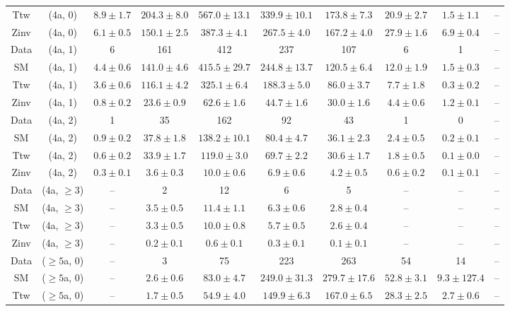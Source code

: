 \begin{table}[h!]
{\begin{tabular}{cccccccccc}
	Ttw & (4a, 0) & $8.9\pm 1.7$ & $204.3\pm 8.0$ & $567.0\pm 13.1$ & $339.9\pm 10.1$ & $173.8\pm 7.3$ & $20.9\pm 2.7$ & $1.5\pm 1.1$ & -- \\[0.5ex] 
	Zinv & (4a, 0) & $6.1\pm 0.5$ & $150.1\pm 2.5$ & $387.3\pm 4.1$ & $267.5\pm 4.0$ & $167.2\pm 4.0$ & $27.9\pm 1.6$ & $6.9\pm 0.4$ & -- \\[0.5ex] 
	Data & (4a, 1) & 6 & 161 & 412 & 237 & 107 & 6 & 1 & -- \\[0.5ex] 
	SM & (4a, 1) & $4.4\pm 0.6$ & $141.0\pm 4.6$ & $415.5\pm 29.7$ & $244.8\pm 13.7$ & $120.5\pm 6.4$ & $12.0\pm 1.9$ & $1.5\pm 0.3$ & -- \\[0.5ex] 
	Ttw & (4a, 1) & $3.6\pm 0.6$ & $116.1\pm 4.2$ & $325.1\pm 6.4$ & $188.3\pm 5.0$ & $86.0\pm 3.7$ & $7.7\pm 1.8$ & $0.3\pm 0.2$ & -- \\[0.5ex] 
	Zinv & (4a, 1) & $0.8\pm 0.2$ & $23.6\pm 0.9$ & $62.6\pm 1.6$ & $44.7\pm 1.6$ & $30.0\pm 1.6$ & $4.4\pm 0.6$ & $1.2\pm 0.1$ & -- \\[0.5ex] 
	Data & (4a, 2) & 1 & 35 & 162 & 92 & 43 & 1 & 0 & -- \\[0.5ex] 
	SM & (4a, 2) & $0.9\pm 0.2$ & $37.8\pm 1.8$ & $138.2\pm 10.1$ & $80.4\pm 4.7$ & $36.1\pm 2.3$ & $2.4\pm 0.5$ & $0.2\pm 0.1$ & -- \\[0.5ex] 
	Ttw & (4a, 2) & $0.6\pm 0.2$ & $33.9\pm 1.7$ & $119.0\pm 3.0$ & $69.7\pm 2.2$ & $30.6\pm 1.7$ & $1.8\pm 0.5$ & $0.1\pm 0.0$ & -- \\[0.5ex] 
	Zinv & (4a, 2) & $0.3\pm 0.1$ & $3.6\pm 0.3$ & $10.0\pm 0.6$ & $6.9\pm 0.6$ & $4.2\pm 0.5$ & $0.6\pm 0.2$ & $0.1\pm 0.1$ & -- \\[0.5ex] 
	Data & (4a, $\ge3$) & -- & 2 & 12 & 6 & 5 & -- & -- & -- \\[0.5ex] 
	SM & (4a, $\ge3$) & -- & $3.5\pm 0.5$ & $11.4\pm 1.1$ & $6.3\pm 0.6$ & $2.8\pm 0.4$ & -- & -- & -- \\[0.5ex] 
	Ttw & (4a, $\ge3$) & -- & $3.3\pm 0.5$ & $10.0\pm 0.8$ & $5.7\pm 0.5$ & $2.6\pm 0.4$ & -- & -- & -- \\[0.5ex] 
	Zinv & (4a, $\ge3$) & -- & $0.2\pm 0.1$ & $0.6\pm 0.1$ & $0.3\pm 0.1$ & $0.1\pm 0.1$ & -- & -- & -- \\[0.5ex] 
	Data & ($\ge5$a, 0) & -- & 3 & 75 & 223 & 263 & 54 & 14 & -- \\[0.5ex] 
	SM & ($\ge5$a, 0) & -- & $2.6\pm 0.6$ & $83.0\pm 4.7$ & $249.0\pm 31.3$ & $279.7\pm 17.6$ & $52.8\pm 3.1$ & $9.3\pm 127.4$ & -- \\[0.5ex] 
	Ttw & ($\ge5$a, 0) & -- & $1.7\pm 0.5$ & $54.9\pm 4.0$ & $149.9\pm 6.3$ & $167.0\pm 6.5$ & $28.3\pm 2.5$ & $2.7\pm 0.6$ & -- \\[0.5ex] 

\end{tabular}}
\end{table}
